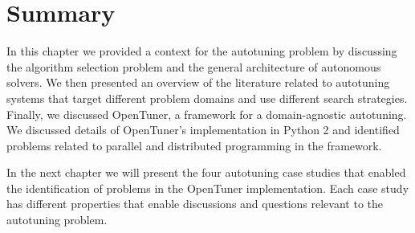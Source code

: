 %
%
%
%
%

\section{Summary}

In this chapter we provided a context for the autotuning problem by discussing
the algorithm selection problem and the general architecture of autonomous
solvers.  We then presented an overview of the literature related to autotuning
systems that target different problem domains and use different search
strategies. Finally, we discussed OpenTuner, a framework for a domain-agnostic
autotuning. We discussed details of OpenTuner's implementation in Python 2 and
identified problems related to parallel and distributed programming in the
framework.

In the next chapter we will present the four autotuning case studies that
enabled the identification of problems in the OpenTuner implementation. Each
case study has different properties that enable discussions and questions
relevant to the autotuning problem.
